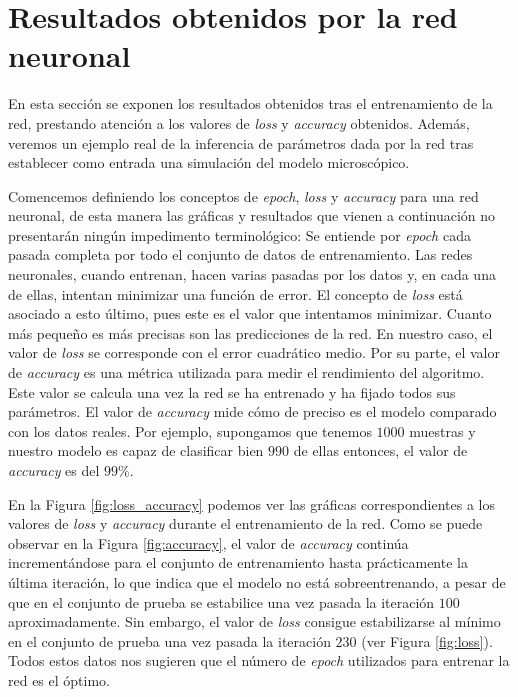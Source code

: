 \section{Resultados obtenidos por la red neuronal}

En esta sección se exponen los resultados obtenidos tras el entrenamiento de la red, prestando atención a los valores de \textit{loss} y \textit{accuracy} obtenidos. Además, veremos un ejemplo real de la inferencia de parámetros dada por la red tras establecer como entrada una simulación del modelo microscópico. 

Comencemos definiendo los conceptos de \textit{epoch}, \textit{loss} y \textit{accuracy} para una red neuronal, de esta manera las gráficas y resultados que vienen a continuación no presentarán ningún impedimento terminológico: Se entiende por \textit{epoch} cada pasada completa por todo el conjunto de datos de entrenamiento. Las redes neuronales, cuando entrenan, hacen varias pasadas por los datos y, en cada una de ellas, intentan minimizar una función de error. El concepto de \textit{loss} está asociado a esto último, pues este es el valor que intentamos minimizar. Cuanto más pequeño es más precisas son las predicciones de la red. En nuestro caso, el valor de \textit{loss} se corresponde con el error cuadrático medio. Por su parte, el valor de \textit{accuracy} es una métrica utilizada para medir el rendimiento del algoritmo. Este valor se calcula una vez la red se ha entrenado y ha fijado todos sus parámetros. El valor de \textit{accuracy} mide cómo de preciso es el modelo comparado con los datos reales. Por ejemplo, supongamos que tenemos $1000$ muestras y nuestro modelo es capaz de clasificar bien $990$ de ellas entonces, el valor de \textit{accuracy} es del $99\%$.

En la Figura \ref{fig:loss_accuracy} podemos ver las gráficas correspondientes a los valores de \textit{loss} y \textit{accuracy} durante el entrenamiento de la red. Como se puede observar en la Figura \ref{fig:accuracy}, el valor de \textit{accuracy} continúa incrementándose para el conjunto de entrenamiento hasta prácticamente la última iteración, lo que indica que el modelo no está sobreentrenando, a pesar de que en el conjunto de prueba se estabilice una vez pasada la iteración $100$ aproximadamente. Sin embargo, el valor de \textit{loss} consigue estabilizarse al mínimo en el conjunto de prueba una vez pasada la iteración $230$ (ver Figura \ref{fig:loss}). Todos estos datos nos sugieren que el número de \textit{epoch} utilizados para entrenar la red es el óptimo.


